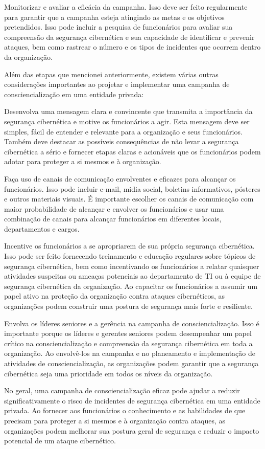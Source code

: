 Monitorizar e avaliar a eficácia da campanha. Isso deve ser feito regularmente para garantir que a campanha esteja atingindo as metas e os objetivos pretendidos. Isso pode incluir a pesquisa de funcionários para avaliar sua compreensão da segurança cibernética e sua capacidade de identificar e prevenir ataques, bem como rastrear o número e os tipos de incidentes que ocorrem dentro da organização.

Além das etapas que mencionei anteriormente, existem várias outras considerações importantes ao projetar e implementar uma campanha de consciencialização em uma entidade privada:

Desenvolva uma mensagem clara e convincente que transmita a importância da segurança cibernética e motive os funcionários a agir. Esta mensagem deve ser simples, fácil de entender e relevante para a organização e seus funcionários. Também deve destacar as possíveis consequências de não levar a segurança cibernética a sério e fornecer etapas claras e acionáveis que os funcionários podem adotar para proteger a si mesmos e à organização.

Faça uso de canais de comunicação envolventes e eficazes para alcançar os funcionários. Isso pode incluir e-mail, midia social, boletins informativos, pósteres e outros materiais visuais. É importante escolher os canais de comunicação com maior probabilidade de alcançar e envolver os funcionários e usar uma combinação de canais para alcançar funcionários em diferentes locais, departamentos e cargos.

Incentive os funcionários a se apropriarem de sua própria segurança cibernética. Isso pode ser feito fornecendo treinamento e educação regulares sobre tópicos de segurança cibernética, bem como incentivando os funcionários a relatar quaisquer atividades suspeitas ou ameaças potenciais ao departamento de TI ou à equipe de segurança cibernética da organização. Ao capacitar os funcionários a assumir um papel ativo na proteção da organização contra ataques cibernéticos, as organizações podem construir uma postura de segurança mais forte e resiliente.

Envolva os líderes seniores e a gerência na campanha de consciencialização. Isso é importante porque os líderes e gerentes seniores podem desempenhar um papel crítico na consciencialização e compreensão da segurança cibernética em toda a organização. Ao envolvê-los na campanha e no planeamento e implementação de atividades de consciencialização, as organizações podem garantir que a segurança cibernética seja uma prioridade em todos os níveis da organização.

No geral, uma campanha de consciencialização eficaz pode ajudar a reduzir significativamente o risco de incidentes de segurança cibernética em uma entidade privada. Ao fornecer aos funcionários o conhecimento e as habilidades de que precisam para proteger a si mesmos e à organização contra ataques, as organizações podem melhorar sua postura geral de segurança e reduzir o impacto potencial de um ataque cibernético.

\newpage
